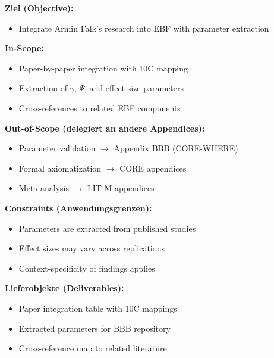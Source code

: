 
\begin{tcolorbox}[
    colback=orange!5!white,
    colframe=orange!75!black,
    title={\textbf{Appendix Scope: Ziel / In-Scope / Out-of-Scope / Constraints}},
    fonttitle=\bfseries
]

\textbf{Ziel (Objective):}
\begin{itemize}[nosep]
    \item Integrate Armin Falk's research into EBF with parameter extraction
\end{itemize}

\textbf{In-Scope:}
\begin{itemize}[nosep]
    \item Paper-by-paper integration with 10C mapping
    \item Extraction of $\gamma$, $\Psi$, and effect size parameters
    \item Cross-references to related EBF components
\end{itemize}

\textbf{Out-of-Scope (delegiert an andere Appendices):}
\begin{itemize}[nosep]
    \item Parameter validation $\rightarrow$ Appendix BBB (CORE-WHERE)
    \item Formal axiomatization $\rightarrow$ CORE appendices
    \item Meta-analysis $\rightarrow$ LIT-M appendices
\end{itemize}

\textbf{Constraints (Anwendungsgrenzen):}
\begin{itemize}[nosep]
    \item Parameters are extracted from published studies
    \item Effect sizes may vary across replications
    \item Context-specificity of findings applies
\end{itemize}

\textbf{Lieferobjekte (Deliverables):}
\begin{itemize}[nosep]
    \item Paper integration table with 10C mappings
    \item Extracted parameters for BBB repository
    \item Cross-reference map to related literature
\end{itemize}

\end{tcolorbox}

